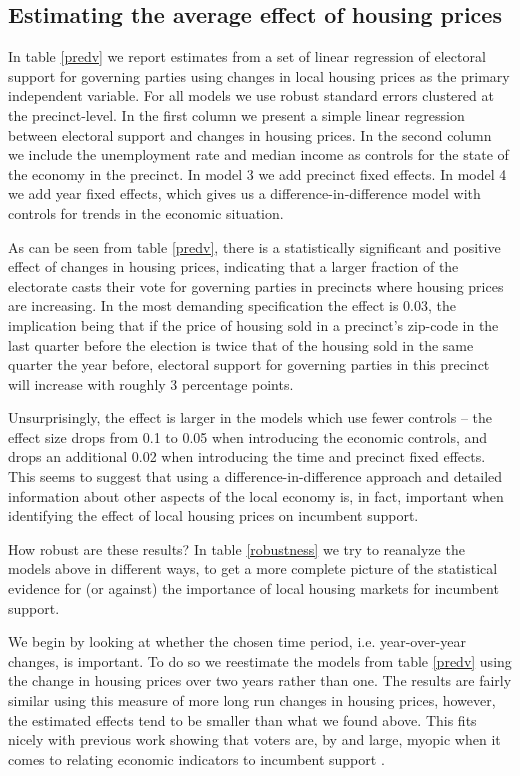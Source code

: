 \documentclass[12pt,a4paper]{article}
\begin{document}
\subsection{Estimating the average effect of housing prices}
In table \ref{predv}  we report estimates from a set of linear regression of electoral support for governing parties using changes in local housing prices as the primary independent variable. For all models we use robust standard errors clustered at the precinct-level. In the first column we present a simple linear regression between electoral support and changes in housing prices. In the second column we include the unemployment rate and median income as controls for the state of the economy in the precinct. In model 3 we add precinct fixed effects. In model 4 we add year fixed effects, which gives us a difference-in-difference model with controls for trends in the economic situation. 




As can be seen from table \ref{predv}, there is a statistically significant and positive effect of changes in housing prices, indicating that a larger fraction of the electorate casts their vote for governing parties in precincts where housing prices are increasing. In the most demanding specification the effect is 0.03, the implication being that if the price of housing sold in a precinct's zip-code in the last quarter before the election is twice that of the housing sold in the same quarter the year before, electoral support for  governing parties in this precinct will increase with roughly 3 percentage points.

Unsurprisingly, the effect is larger in the models which use fewer controls --  the effect size drops from 0.1 to 0.05 when introducing the economic controls, and drops an additional 0.02 when introducing the time and precinct fixed effects. This seems to suggest that using a difference-in-difference approach and detailed information about other aspects of the local economy is, in fact, important when identifying the effect of local housing prices on incumbent support.




How robust are these results? In table \ref{robustness} we try to reanalyze the models above in different ways, to get a more complete picture of the statistical evidence for (or against) the importance of local housing markets for incumbent support. 

We begin by looking at whether the chosen time period, i.e. year-over-year changes, is important. To do so we reestimate the models from table \ref{predv} using the change in housing prices over two years rather than one. The results are fairly similar using this measure of more long run changes in housing prices, however, the estimated effects tend to be smaller than what we found above. This fits nicely with previous work showing that voters are, by and large, myopic when it comes to relating economic indicators to incumbent support \citep{healy2009myopic,healy2014substituting}. 
\end{document}
